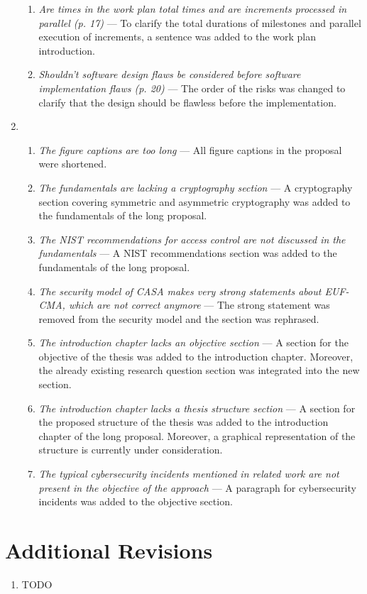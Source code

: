 \begin{enumerate}[label=R\arabic*.]
\begin{enumerate}[label=Q\arabic*.]
        \item \textit{Are times in the work plan total times and are increments processed in parallel (p. 17)} --- To clarify the total durations of milestones and parallel execution of increments, a sentence was added to the work plan introduction.
        \item \textit{Shouldn't software design flaws be considered before software implementation flaws (p. 20)} --- The order of the risks was changed to clarify that the design should be flawless before the implementation.
    \end{enumerate}
    \item \begin{enumerate}[label=Q\arabic*.]
        \item \textit{The figure captions are too long} --- All figure captions in the proposal were shortened.
        \item \textit{The fundamentals are lacking a cryptography section} --- A cryptography section covering symmetric and asymmetric cryptography was added to the fundamentals of the long proposal.
        \item \textit{The NIST recommendations for access control are not discussed in the fundamentals} --- A NIST recommendations section was added to the fundamentals of the long proposal.
        \item \textit{The security model of CASA makes very strong statements about EUF-CMA, which are not correct anymore} --- The strong statement was removed from the security model and the section was rephrased.
        \item \textit{The introduction chapter lacks an objective section} --- A section for the objective of the thesis was added to the introduction chapter. Moreover, the already existing research question section was integrated into the new section.
        \item \textit{The introduction chapter lacks a thesis structure section} --- A section for the proposed structure of the thesis was added to the introduction chapter of the long proposal. Moreover, a graphical representation of the structure is currently under consideration.
        \item \textit{The typical cybersecurity incidents mentioned in related work are not present in the objective of the approach} --- A paragraph for cybersecurity incidents was added to the objective section.
    \end{enumerate}
\end{enumerate}

\section{Additional Revisions}
\begin{enumerate}[label=A\arabic*.]
    \item TODO
\end{enumerate}
